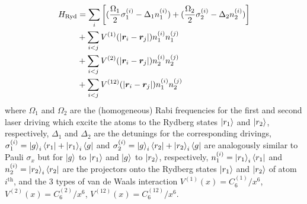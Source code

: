 \documentclass[%
 reprint,
nofootinbib,
 amsmath,amssymb,
 aps,
floatfix,
]{revtex4-2}
\begin{document}
\begin{align}\label{eq:H_ryd}
H_{\textit{\rm Ryd}} &= \sum_{i} \left[ (\frac{\Omega_1}{2}\sigma^{(i)}_1 - \Delta_1 n^{(i)}_1 ) + (\frac{\Omega_2} {2}\sigma^{(i)}_2 - \Delta_2 n^{(i)}_2 ) \right] \nonumber \\ 
&+ \sum_{i<j} V^{(1)}(|\boldsymbol{r}_i - \boldsymbol{r}_j|) n^{(i)}_1 n^{(j)}_1  \nonumber \\ 
&+ \sum_{i<j} V^{(2)}(|\boldsymbol{r}_i - \boldsymbol{r}_j|) n^{(i)}_2 n^{(j)}_2 \\
&+ \sum_{i<j} V^{(12)}(|\boldsymbol{r}_i - \boldsymbol{r}_j|) n^{(i)}_1 n^{(j)}_2 \nonumber
\end{align}
where $\Omega_1$ and $\Omega_2$ are the (homogeneous) Rabi frequencies for the first and second laser driving which excite the atoms to the Rydberg states $\ket{r_1}$ and $\ket{r_2}$, respectively, $\Delta_1$ and $\Delta_2$ are the detunings for the corresponding drivings, $\sigma^{(i)}_1 = \ket{g}_i\bra{r_1} + \ket{r_1}_i \bra{g}$ and $\sigma^{(i)}_2 = \ket{g}_i\bra{r_2} + \ket{r_2}_i \bra{g}$ are analogously similar to Pauli $\sigma_x$ but for $\ket{g}$ to $\ket{r_1}$ and $\ket{g}$ to $\ket{r_2}$, respectively,  $n^{(i)}_1 = \ket{r_1}_i \bra{r_1}$ and $n^{(i)}_2 = \ket{r_2}_i \bra{r_2}$ are the projectors onto the Rydberg states $\ket{r_1}$ and $\ket{r_2}$ of atom $i^{\text{th}}$, and the 3 types of van de Waals interaction $V^{(1)}(x) = C^{(1)}_6/x^6$, $V^{(2)}(x) = C^{(2)}_6/x^6$, $V^{(12)}(x) = C^{(12)}_6/x^6$. \\
\end{document}
